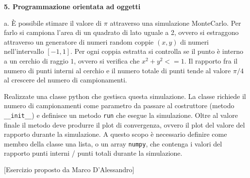 \documentclass[addpoints]{exam}
\newenvironment{palatino}{\fontfamily{ppl}\selectfont}{\par}
\begin{document}
\begin{palatino}
\hphantom{ciao}

\textbf{5. Programmazione orientata ad oggetti}

\hphantom{ciao}

a. \quad È possibile stimare il valore di $\pi$ attraverso una simulazione MonteCarlo.
Per farlo si campiona l'area di un quadrato di lato uguale a 2, ovvero si estraggono attraverso un generatore di numeri random coppie $(x,y)$ di numeri nell'intervallo $[-1,1]$.
Per ogni coppia estratta si controlla se il punto è interno a un cerchio di raggio $1$, ovvero si verifica che $x^2+y^2 <= 1$. 
Il rapporto fra il numero di punti interni al cerchio e il numero totale di punti tende al valore $\pi/4$ al crescere del numero di campionamenti.

\hphantom{ciao}

Realizzate una classe python che gestisca questa simulazione. 
La classe richiede il numero di campionamenti come parametro da passare al costruttore (metodo \texttt{\_\_init\_\_}) e definisce un metodo \texttt{run} che esegue la simulazione. 
Oltre al valore finale il metodo deve produrre il plot di convergenza, ovvero il plot del valore del rapporto durante la simulazione. 
A questo scopo è necessario definire come membro della classe una lista, o un array \texttt{numpy}, che contenga i valori del rapporto punti interni / punti totali durante la simulazione.

\hphantom{ciao}

[Esercizio proposto da Marco D'Alessandro]

\FloatBarrier

\end{palatino}
\end{document}
